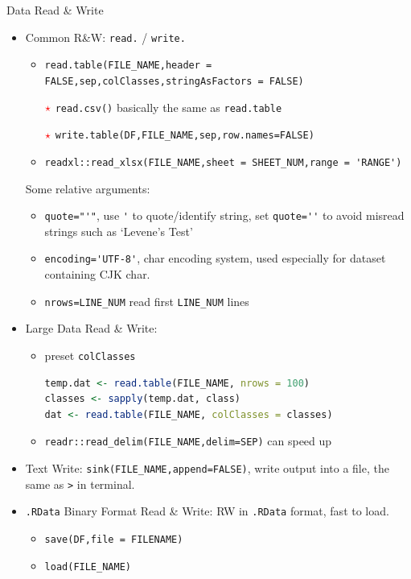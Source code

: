    
\begin{point}
    Data Read \& Write
\end{point}
\begin{itemize}[topsep=2pt,itemsep=0pt]
    \item Common R\&W: \lstinline|read.| / \lstinline|write.|
    \begin{itemize}[topsep=2pt,itemsep=0pt]
        \item \lstinline|read.table(FILE_NAME,header = FALSE,sep,colClasses,stringAsFactors = FALSE)|
        \item[${\color{red}\star }$] \lstinline|read.csv()| basically the same as \lstinline|read.table|
        \item[${\color{red}\star }$] \lstinline|write.table(DF,FILE_NAME,sep,row.names=FALSE)|
        \item \lstinline|readxl::read_xlsx(FILE_NAME,sheet = SHEET_NUM,range = 'RANGE')|
    \end{itemize}

    Some relative arguments:
    \begin{itemize}[topsep=2pt,itemsep=0pt]
        \item \lstinline|quote="'"|, use \lstinline|'| to quote/identify string, set \lstinline|quote=''| to avoid misread strings such as `Levene's Test'
        \item \lstinline|encoding='UTF-8'|, char encoding system, used especially for dataset containing CJK char.
        \item \lstinline|nrows=LINE_NUM| read first \lstinline|LINE_NUM| lines
    \end{itemize}

    \item Large Data Read \& Write: 
    \begin{itemize}[topsep=2pt,itemsep=0pt]
        \item preset \lstinline|colClasses|
        
\begin{lstlisting}[language=R]
temp.dat <- read.table(FILE_NAME, nrows = 100)
classes <- sapply(temp.dat, class)
dat <- read.table(FILE_NAME, colClasses = classes)
\end{lstlisting}
        \item \lstinline|readr::read_delim(FILE_NAME,delim=SEP)| can speed up
    \end{itemize}
    
    \item Text Write: \lstinline|sink(FILE_NAME,append=FALSE)|, write output into a file, the same as \lstinline|>| in terminal.
    \item \lstinline|.RData| Binary Format Read \& Write: RW in \lstinline|.RData| format, fast to load.
    \begin{itemize}[topsep=2pt,itemsep=0pt]
        \item \lstinline|save(DF,file = FILENAME)|
        \item \lstinline|load(FILE_NAME)|
    \end{itemize}
\end{itemize}

